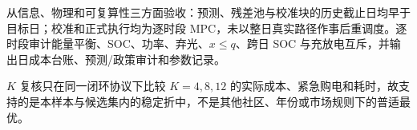 从信息、物理和可复算性三方面验收：预测、残差池与校准块的历史截止日均早于目标日；校准和正式执行均为逐时段 MPC，未以整日真实路径作事后重调度。逐时段审计能量平衡、SOC、功率、弃光、$x\le q$、跨日 SOC 与充放电互斥，并输出日成本台账、预测/政策审计和参数记录。

$K$ 复核只在同一闭环协议下比较 $K=4,8,12$ 的实际成本、紧急购电和耗时，故支持的是本样本与候选集内的稳定折中，不是其他社区、年份或市场规则下的普适最优。
